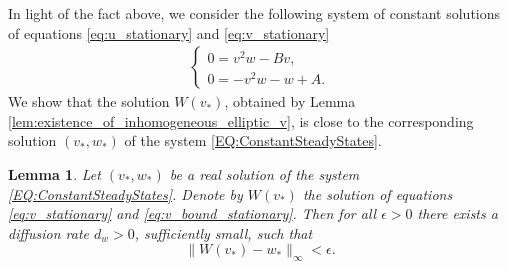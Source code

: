 \documentclass[preprint,12pt]{elsarticle}
\theoremstyle{plain}
\newtheorem{lem}{Lemma}[section]
\theoremstyle{definition}
\theoremstyle{remark}
\begin{document}
In light of the fact above, we consider the following system of constant solutions of equations \eqref{eq:u_stationary} and \eqref{eq:v_stationary}
\begin{align}
    \label{EQ:ConstantSteadyStates}
    \begin{cases}
        0 = v^2w - Bv,\\
        0 = -v^2w - w + A.
    \end{cases}
\end{align}
We show that the solution $W(v_*)$, obtained by Lemma \ref{lem:existence_of_inhomogeneous_elliptic_v}, is close to the corresponding solution $(v_*, w_*)$ of the system \eqref{EQ:ConstantSteadyStates}. 

\begin{lem}
    \label{lem:stationary_v_estimate_v_star}
    Let $(v_*, w_*)$ be a real solution of the system \eqref{EQ:ConstantSteadyStates}. Denote by $W(v_*)$ the solution of equations \eqref{eq:v_stationary} and \eqref{eq:v_bound_stationary}. Then for all $\epsilon > 0$ there exists a diffusion rate $d_w > 0$, sufficiently small, such that
    \begin{equation*}
        \| W(v_*) - w_*\|_\infty < \epsilon.
    \end{equation*}
\end{lem}
\end{document}
